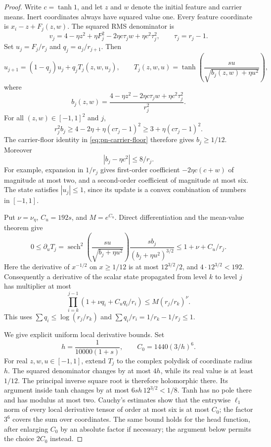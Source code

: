 \begin{proof}
Write $c=\tanh1$, and let $z$ and $w$ denote the initial feature
and carrier means. Inert coordinates always have squared value one.
Every feature coordinate is $x_i-z+F_j(z,w)$. The squared RMS
denominator is
\[
 v_j=4-\eta z^2+\eta F_j^2-2\eta c\tau_j w
                         +\eta c^2\tau_j^2,
 \qquad \tau_j=r_j-1.
\]
Set $u_j=F_j/r_j$ and $q_j=a_j/r_{j+1}$. Then
\[
 u_{j+1}=(1-q_j)u_j+q_j T_j(z,w,u_j),\qquad
 T_j(z,w,u)=\tanh\!\left(
 \frac{su}{\sqrt{b_j(z,w)+\eta u^2}}\right),
\]
where
\[
 b_j(z,w)=
 \frac{4-\eta z^2-2\eta c\tau_j w+\eta c^2\tau_j^2}{r_j^2}.
\]
For all $(z,w)\in[-1,1]^2$ and $j$,
\[
 r_j^2b_j\ge4-2\eta+\eta(c\tau_j-1)^2
              \ge3+\eta(c\tau_j-1)^2.
\]
The carrier-floor identity in \eqref{eq:pn-carrier-floor}
therefore gives $b_j\ge1/12$. Moreover
\[
 |b_j-\eta c^2|\le8/r_j.
\]
For example, expansion in $1/r_j$ gives first-order coefficient
$-2\eta c(c+w)$ of magnitude at most two, and a second-order
coefficient of magnitude at most six. The state satisfies
$|u_j|\le1$, since its update is a convex combination of numbers
in $[-1,1]$.

Put $\nu=\nu_\eta$, $C_u=192s$, and $M=e^{C_u}$. Direct
differentiation and the mean-value theorem give
\[
 0\le\partial_uT_j
 =\operatorname{sech}^2\!\left(
       \frac{su}{\sqrt{b_j+\eta u^2}}\right)
       \frac{s b_j}{(b_j+\eta u^2)^{3/2}}
 \le1+\nu+C_u/r_j.
\]
Here the derivative of $x^{-1/2}$ on $x\ge1/12$ is at most
$12^{3/2}/2$, and $4\cdot12^{3/2}<192$.
Consequently a derivative of the scalar state propagated from
level $k$ to level $j$ has multiplier at most
\begin{equation}
 \prod_{i=k}^{j-1}(1+\nu q_i+C_u q_i/r_i)
 \le M(r_j/r_k)^\nu.
 \label{eq:pn-family-derivative-product}
\end{equation}
This uses $\sum q_i\le\log(r_j/r_k)$ and
$\sum q_i/r_i=1/r_k-1/r_j\le1$.

We give explicit uniform local derivative bounds. Set
\[
 h=\frac1{10000(1+s)},\qquad C_0=1440(3/h)^6.
\]
For real $z,w,u\in[-1,1]$, extend $T_j$ to the complex polydisk
of coordinate radius $h$. The squared denominator changes by
at most $4h$, while its real value is at least $1/12$.
The principal inverse square root is therefore holomorphic there.
Its argument inside tanh changes by at most
$6s h\,12^{3/2}<1/8$. Tanh has no pole there and has modulus
at most two. Cauchy's estimates show that the entrywise $\ell_1$
norm of every local derivative tensor of order at most six is
at most $C_0$; the factor $3^6$ covers the sum over coordinates.
The same bound holds for the head function, after enlarging $C_0$
by an absolute factor if necessary; the argument below permits
the choice $2C_0$ instead.


\end{proof}
